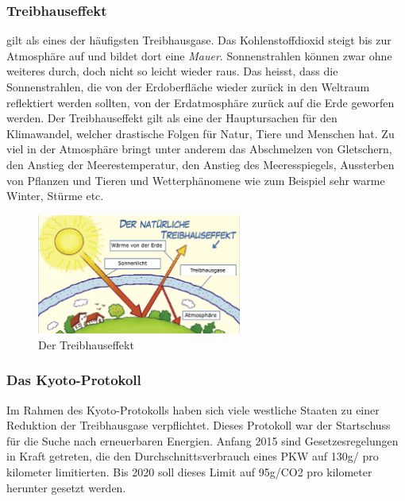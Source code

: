 \subsubsection{Treibhauseffekt}
 gilt als eines der häufigsten Treibhausgase.
Das Kohlenstoffdioxid steigt bis zur Atmosphäre auf und bildet dort eine \textit{Mauer}.
Sonnenstrahlen können zwar ohne weiteres durch, doch nicht so leicht wieder raus. Das heisst, dass die Sonnenstrahlen,
die von der Erdoberfläche wieder zurück in den Weltraum reflektiert werden sollten, von der Erdatmosphäre zurück auf die Erde geworfen werden.
Der Treibhauseffekt gilt als eine der Hauptursachen für den Klimawandel, welcher drastische Folgen für Natur, Tiere und Menschen hat. 
Zu viel  in der Atmosphäre bringt unter anderem das Abschmelzen von Gletschern, 
den Anstieg der Meerestemperatur, den Anstieg des Meeresspiegels, 
Aussterben von Pflanzen und Tieren und Wetterphänomene wie zum Beispiel sehr warme Winter, Stürme etc.

\begin{figure}[!htb]\centering
	\includegraphics[width=0.6\textwidth]{images/treibhaus1}
	\caption{Der Treibhauseffekt \cite{BOZH.ch1-co2-umwelt.treibhaus1}}
\end{figure}
 
\subsubsection{Das Kyoto-Protokoll}
Im Rahmen des Kyoto-Protokolls haben sich viele westliche Staaten zu einer Reduktion der Treibhausgase verpflichtet. 
Dieses Protokoll war der Startschuss für die Suche nach erneuerbaren Energien. 
Anfang 2015 sind Gesetzesregelungen in Kraft getreten, die den Durchschnittsverbrauch eines PKW auf 130g/ pro kilometer limitierten. 
Bis 2020 soll dieses Limit auf 95g/CO2 pro kilometer herunter gesetzt werden.

\clearpage